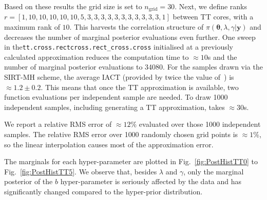 Based on these results the grid size is set to $n_{\text{grid}} = 30$.
Next, we define ranks $r =[ 1,  10,  10, 10, 10, 10, 5, 3, 3, 3, 3, 3, 3 , 3, 3, 3, 3, 3, 1]$ between TT cores, with a maximum rank of $10$.
This harvests the correlation structure of $\pi(\bm{\theta},\lambda,\gamma  | \bm{y})$ and decreases the number of marginal posterior evaluations even further.
One sweep in the\linebreak \texttt{tt.cross.rectcross.rect\_cross.cross} initialised at a previously calculated approximation reduces the computation time to $\approx 10$s and the number of marginal posterior evaluations to 34080.
For the samples drawn via the SIRT-MH scheme, the average IACT (provided by twice the value of~\cite{wolff2004monte, drikHesse}) is $\approx 1.2 \pm 0.2$.
This means that once the TT approximation is available, two function evaluations per independent sample are needed.
To draw 1000 independent samples, including generating a TT approximation, takes $\approx30$s.

We report a relative RMS error of $\approx 12 \%$ evaluated over those 1000 independent samples.
The relative RMS error over 1000 randomly chosen grid points is $\approx 1\%$, so the linear interpolation causes most of the approximation error.

The marginals for each hyper-parameter are plotted in Fig.~\ref{fig:PostHistTT0} to Fig.~\ref{fig:PostHistTT5}.
We observe that, besides $\lambda$ and $\gamma$, only the marginal posterior of the $b$ hyper-parameter is seriously affected by the data and has significantly changed compared to the hyper-prior distribution.

\clearpage

